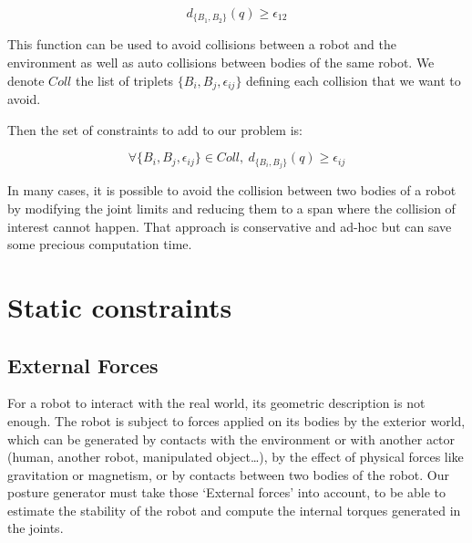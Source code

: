 \begin{equation}
  \boxed{d_{\{B_1, B_2\}}(q) \geq \epsilon_{12}}
\end{equation}

This function can be used to avoid collisions between a robot and the environment as well as auto collisions between bodies of the same robot.
We denote $Coll$ the list of triplets $\{B_i, B_j, \epsilon_{ij}\}$ defining each collision that we want to avoid.

Then the set of constraints to add to our problem is:

\begin{equation}
  \boxed{\forall \{B_i, B_j, \epsilon_{ij}\} \in Coll,\ d_{\{B_i, B_j\}}(q) \geq \epsilon_{ij}}
\end{equation}

In many cases, it is possible to avoid the collision between two bodies of a robot by modifying the joint limits and reducing them to a span where the collision of interest cannot happen.
That approach is conservative and ad-hoc but can save some precious computation time.



\section{Static constraints}
\label{sec:static_constraints}


\subsection{External Forces}
\label{sub:external_forces}


For a robot to interact with the real world, its geometric description is not enough.
The robot is subject to forces applied on its bodies by the exterior world, which can be generated by contacts with the environment or with another actor (human, another robot, manipulated object\ldots), by the effect of physical forces like gravitation or magnetism, or by contacts between two bodies of the robot.
Our posture generator must take those `External forces' into account, to be able to estimate the stability of the robot and compute the internal torques generated in the joints.

